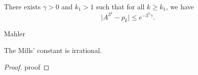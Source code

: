 \begin{lemma}
    \label{lem:lemma7}
    There exists $\gamma > 0$ and $k_1 > 1$ such that for all $k \geq k_1$, we have
    $$
    \lvert A ^ {3 ^ k} - p_k\rvert \leq e^{-3 ^ k\gamma}.
    $$
\end{lemma}

\begin{theorem}
    \label{thm:Mahler}
    Mahler
\end{theorem}

\begin{theorem}
    \label{thm:mills_irrational}
    The Mills' constant is irrational.    
\end{theorem}

\begin{proof}
    proof
\end{proof}